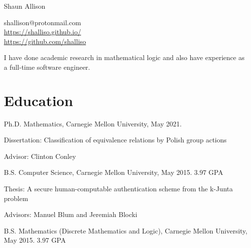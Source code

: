 \documentclass[letterpaper]{article}
\def\name{Shaun Allison}
\renewenvironment{itemize}{
  \begin{list}{}{
    \setlength{\leftmargin}{1.5em}
  }
}{
  \end{list}
}
\begin{document}
{\huge \name}


\vspace{0.25in}

\begin{minipage}{0.45\linewidth}
  shallison@protonmail.com\\
  \url{https://shalliso.github.io/}\\
  \url{https://github.com/shalliso}
\end{minipage}

\vspace{0.25in}
I have done academic research in mathematical logic and also have experience as a full-time software engineer.

\section*{Education}
\begin{itemize}
  \item Ph.D. Mathematics, Carnegie Mellon University, May 2021.
  \begin{itemize}
      \item Dissertation: Classification of equivalence relations by Polish group actions
      \item Advisor: Clinton Conley
  \end{itemize}
  \item B.S. Computer Science, Carnegie Mellon University, May 2015. $3.97$ GPA
  \begin{itemize}
      \item Thesis: A secure human-computable authentication scheme from the k-Junta problem
      \item Advisors: Manuel Blum and Jeremiah Blocki
  \end{itemize}
  \item B.S. Mathematics (Discrete Mathematics and Logic), Carnegie Mellon University, May 2015. $3.97$ GPA
\end{itemize}
\end{document}

